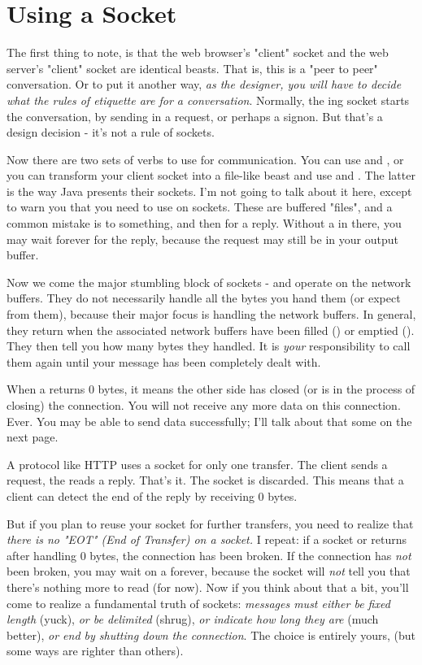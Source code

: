 \documentclass{howto}
\begin{document}
\section{Using a Socket}

The first thing to note, is that the web browser's "client" socket and
the web server's "client" socket are identical beasts. That is, this
is a "peer to peer" conversation. Or to put it another way, \emph{as the
designer, you will have to decide what the rules of etiquette are for
a conversation}. Normally, the ing socket
starts the conversation, by sending in a request, or perhaps a
signon. But that's a design decision - it's not a rule of sockets.

Now there are two sets of verbs to use for communication. You can use
 and , or you can transform your
client socket into a file-like beast and use  and
. The latter is the way Java presents their
sockets. I'm not going to talk about it here, except to warn you that
you need to use  on sockets. These are buffered
"files", and a common mistake is to  something, and
then  for a reply. Without a  in
there, you may wait forever for the reply, because the request may
still be in your output buffer.

Now we come the major stumbling block of sockets - 
and  operate on the network buffers. They do not
necessarily handle all the bytes you hand them (or expect from them),
because their major focus is handling the network buffers. In general,
they return when the associated network buffers have been filled
() or emptied (). They then tell you
how many bytes they handled. It is \emph{your} responsibility to call
them again until your message has been completely dealt with.

When a  returns 0 bytes, it means the other side has
closed (or is in the process of closing) the connection.  You will not
receive any more data on this connection. Ever.  You may be able to
send data successfully; I'll talk about that some on the next page.

A protocol like HTTP uses a socket for only one transfer. The client
sends a request, the reads a reply.  That's it. The socket is
discarded. This means that a client can detect the end of the reply by
receiving 0 bytes.

But if you plan to reuse your socket for further transfers, you need
to realize that \emph{there is no "EOT" (End of Transfer) on a
socket.} I repeat: if a socket  or
 returns after handling 0 bytes, the connection has
been broken.  If the connection has \emph{not} been broken, you may
wait on a  forever, because the socket will
\emph{not} tell you that there's nothing more to read (for now).  Now
if you think about that a bit, you'll come to realize a fundamental
truth of sockets: \emph{messages must either be fixed length} (yuck),
\emph{or be delimited} (shrug), \emph{or indicate how long they are}
(much better), \emph{or end by shutting down the connection}. The
choice is entirely yours, (but some ways are righter than others).
\end{document}
